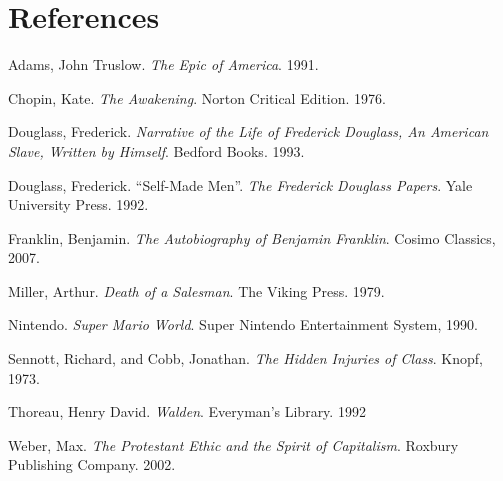 \section*{References}

\bibent Adams, John Truslow. \textit{The Epic of America}. 1991.

\bibent Chopin, Kate. \textit{The Awakening}. Norton Critical Edition. 1976.

\bibent Douglass, Frederick. \textit{Narrative of the Life of Frederick
Douglass, An American Slave, Written by Himself}. Bedford Books. 1993.

\bibent Douglass, Frederick. ``Self-Made Men''. \textit{The Frederick Douglass
Papers}. Yale University Press. 1992.

\bibent Franklin, Benjamin. \textit{The Autobiography of Benjamin Franklin}.
Cosimo Classics, 2007.

\bibent Miller, Arthur. \textit{Death of a Salesman}. The Viking Press. 1979.

\bibent Nintendo. \textit{Super Mario World}. Super Nintendo Entertainment
System, 1990.

\bibent Sennott, Richard, and Cobb, Jonathan. \textit{The Hidden Injuries of
Class}. Knopf, 1973.

\bibent Thoreau, Henry David. \textit{Walden}. Everyman's Library. 1992

\bibent Weber, Max. \textit{The Protestant Ethic and the Spirit of Capitalism}.
Roxbury Publishing Company. 2002.
